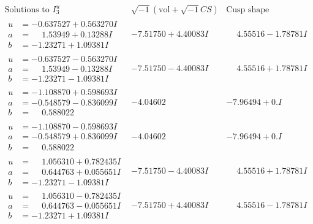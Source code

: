 \documentclass[1p]{elsarticle_modified}
\theoremstyle{definition}
\newcommand{\I}{\sqrt{-1}}
\begin{document}
$$\begin{array}{c|c|c}  
\text{Solutions to }I^u_{3}& \I (\text{vol} + \sqrt{-1}CS) & \text{Cusp shape}\\
 \hline 
\begin{aligned}
u &= -0.637527 + 0.563270 I \\
a &= \phantom{-}1.53949 + 0.13288 I \\
b &= -1.23271 + 1.09381 I\end{aligned}
 & -7.51750 + 4.40083 I & \phantom{-}4.55516 - 1.78781 I \\ \hline\begin{aligned}
u &= -0.637527 - 0.563270 I \\
a &= \phantom{-}1.53949 - 0.13288 I \\
b &= -1.23271 - 1.09381 I\end{aligned}
 & -7.51750 - 4.40083 I & \phantom{-}4.55516 + 1.78781 I \\ \hline\begin{aligned}
u &= -1.108870 + 0.598693 I \\
a &= -0.548579 - 0.836099 I \\
b &= \phantom{-}0.588022\phantom{ +0.000000I}\end{aligned}
 & -4.04602\phantom{ +0.000000I} & -7.96494 + 0. I\phantom{ +0.000000I} \\ \hline\begin{aligned}
u &= -1.108870 - 0.598693 I \\
a &= -0.548579 + 0.836099 I \\
b &= \phantom{-}0.588022\phantom{ +0.000000I}\end{aligned}
 & -4.04602\phantom{ +0.000000I} & -7.96494 + 0. I\phantom{ +0.000000I} \\ \hline\begin{aligned}
u &= \phantom{-}1.056310 + 0.782435 I \\
a &= \phantom{-}0.644763 + 0.055651 I \\
b &= -1.23271 - 1.09381 I\end{aligned}
 & -7.51750 - 4.40083 I & \phantom{-}4.55516 + 1.78781 I \\ \hline\begin{aligned}
u &= \phantom{-}1.056310 - 0.782435 I \\
a &= \phantom{-}0.644763 - 0.055651 I \\
b &= -1.23271 + 1.09381 I\end{aligned}
 & -7.51750 + 4.40083 I & \phantom{-}4.55516 - 1.78781 I \\ \hline\begin{aligned}

\end{aligned}
\end{array}$$
\end{document}
